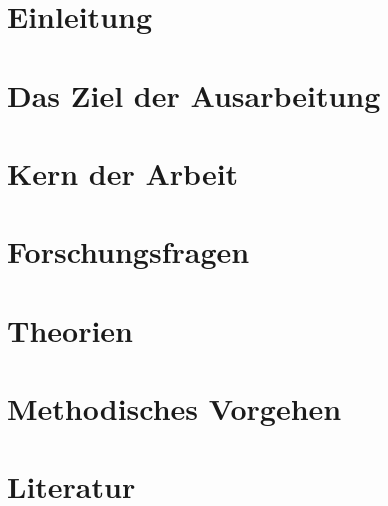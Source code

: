 \documentclass[12pt]{article}
\begin{document}
    
    \newpage

    \tableofcontents
    \newpage

    \section{Einleitung}
        
    
    \section{Das Ziel der Ausarbeitung} 
        

    \section{Kern der Arbeit}
            

    \newpage    
    
    \section{Forschungsfragen}
        
    
    \section{Theorien}
        
    
    \section{Methodisches Vorgehen}
         
    \newpage

    \cite{acar2018}
    \cite{khalimov2022}
    \cite{buell2024}
    
    \section{Literatur}
    	\printbibliography
    	
    
\end{document}
